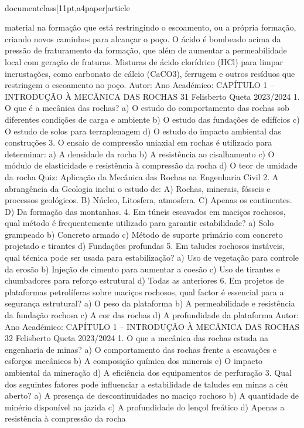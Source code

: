 \\documentclass[11pt,a4paper]{article}
\begin{document}
material na formação que 
está restringindo o 
escoamento, ou a própria 
formação, criando novos 
caminhos para alcançar o 
poço.
O ácido é 
bombeado acima 
da pressão de 
fraturamento da 
formação, que 
além de aumentar 
a permeabilidade 
local com geração 
de fraturas.
Misturas de ácido 
clorídrico (HCl) para 
limpar incrustações, 
como carbonato de 
cálcio (CaCO3), 
ferrugem e outros 
resíduos que 
restringem o 
escoamento no 
poço.
Autor:
Ano Académico:
CAPÍTULO 1 – INTRODUÇÃO À MECÂNICA DAS ROCHAS 31
Felisberto Queta
2023/2024
1. O que é a mecânica das rochas?
a) O estudo do comportamento das rochas sob diferentes condições de carga e ambiente
b) O estudo das fundações de edifícios
c) O estudo de solos para terraplenagem
d) O estudo do impacto ambiental das construções
3. O ensaio de compressão uniaxial em rochas é utilizado para determinar:
a) A densidade da rocha
b) A resistência ao cisalhamento
c) O módulo de elasticidade e resistência à compressão da rocha
d) O teor de umidade da rocha
Quiz: Aplicação da 
Mecânica das 
Rochas na 
Engenharia Civil
2. A abrangência da Geologia inclui o estudo de:
A) Rochas, minerais, fósseis e processos geológicos.
B) Núcleo, Litosfera, atmosfera.
C) Apenas os continentes.
D) Da formação das montanhas.
4. Em túneis escavados em maciços rochosos, qual método é frequentemente utilizado para garantir estabilidade?
a) Solo grampeado
b) Concreto armado
c) Método de suporte primário com concreto projetado e tirantes
d) Fundações profundas
5. Em taludes rochosos instáveis, qual técnica pode ser usada para estabilização?
a) Uso de vegetação para controle da erosão
b) Injeção de cimento para aumentar a coesão
c) Uso de tirantes e chumbadores para reforço estrutural
d) Todas as anteriores
6. Em projetos de plataformas petrolíferas sobre maciços rochosos, qual factor é essencial para a segurança estrutural?
a) O peso da plataforma
b) A permeabilidade e resistência da fundação rochosa
c) A cor das rochas
d) A profundidade da plataforma
Autor:
Ano Académico:
CAPÍTULO 1 – INTRODUÇÃO À MECÂNICA DAS ROCHAS 32
Felisberto Queta
2023/2024
1. O que a mecânica das rochas estuda na engenharia de minas?
a) O comportamento das rochas frente a escavações e esforços mecânicos
b) A composição química dos minerais
c) O impacto ambiental da mineração
d) A eficiência dos equipamentos de perfuração
3. Qual dos seguintes fatores pode influenciar a estabilidade de taludes em minas a céu aberto?
a) A presença de descontinuidades no maciço rochoso
b) A quantidade de minério disponível na jazida
c) A profundidade do lençol freático
d) Apenas a resistência à compressão da rocha
\end{document}
